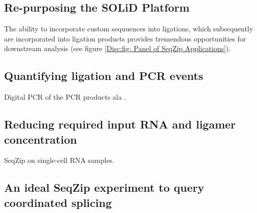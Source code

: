   \subsection{Re-purposing the SOLiD Platform}
    \label{Disc:subsec:SOLiD Platform for SeqZip}


    The ability to incorporate custom sequuences into ligations, which subsequently are incorporated into ligation products provides tremendous opportunities for downstream analysis (see figure \ref{Disc:fig: Panel of SeqZip Applications}).

  \subsection{Quantifying ligation and PCR events}
    \label{Disc:subsec:SeqZip and QPCR}

    Digital PCR of the PCR products ala \citep{Shiroguchi2012a}. 

  \subsection{Reducing required input RNA and ligamer concentration}
    \label{Disc:subsec:Reducing Input RNA and Ligamer Conc.}

    SeqZip on single-cell RNA samples.

  \subsection{An ideal SeqZip experiment to query coordinated splicing}
    \label{Disc:subsec: Ideal SeqZip exp. to look for Coordination}

